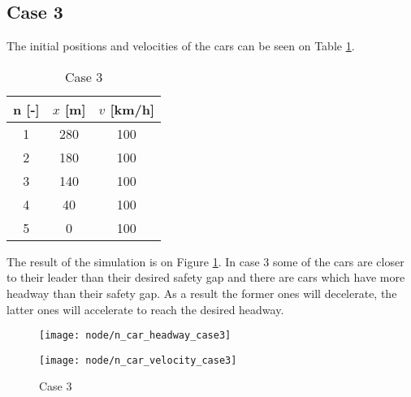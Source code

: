 		\subsection*{Case 3}
		The initial positions and velocities of the cars can be seen on Table \ref{tab:node_case3}.
		\begin{table}
			\centering
			\begin{tabular}{ |c|c|c| }
				\hline
				n [-] & $x$ [m] & $v$ [km/h]\\
				\hline
				1 &  280 & 100 \\
				2 & 180 & 100 \\
				3 & 140 & 100 \\
				4 & 40 & 100 \\
				5 & 0 & 100 \\
				\hline
			\end{tabular}
			\caption{Case 3}
			\label{tab:node_case3}
		\end{table}
		The result of the simulation is on Figure \ref{fig:node_case3}. In case 3 some of the cars are closer to their leader than their desired safety gap and there are cars which have more headway than their safety gap. As a result the former ones will decelerate, the latter ones will accelerate to reach the desired headway.
		\begin{figure}
			\centering
			\begin{minipage}{.5\textwidth}
				\centering
				\texttt{[image: node/n\_car\_headway\_case3]}
			\end{minipage}\hfill
			\begin{minipage}{.5\textwidth}
				\centering
				\texttt{[image: node/n\_car\_velocity\_case3]}
			\end{minipage}
			\caption{Case 3}
			\label{fig:node_case3}
		\end{figure}
